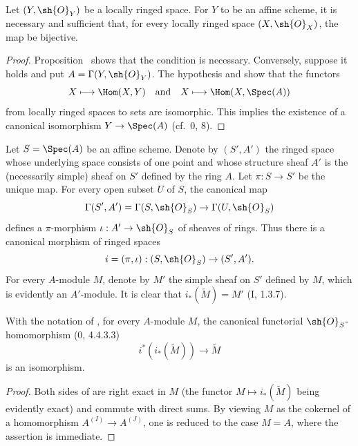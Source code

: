 \begin{corollary}[1.8.3]
\label{I.1.8.3}
Let $(Y,\sh{O}_Y)$ be a locally ringed space.  For $Y$ to be an affine
scheme, it is necessary and sufficient that, for every locally ringed
space $(X,\sh{O}_X)$, the map  be bijective.
\end{corollary}

\begin{proof}
Proposition~ shows that the condition is necessary.
Conversely, suppose it holds and put $A=\Gamma(Y,\sh{O}_Y)$.  The
hypothesis and  show that the functors
\[
  X\longmapsto\Hom(X,Y)
  \quad\hbox{and}\quad
  X\longmapsto\Hom(X,\Spec(A))
\]
from locally ringed spaces to sets are isomorphic.  This implies the
existence of a canonical isomorphism $Y\to\Spec(A)$ (cf.~0, 8).
\end{proof}

\begin{env}[1.8.4]
\label{I.1.8.4}
Let $S=\Spec(A)$ be an affine scheme.  Denote by $(S',A')$ the ringed
space whose underlying space consists of one point and whose
structure sheaf $A'$ is the (necessarily simple) sheaf on $S'$ defined
by the ring $A$.  Let $\pi:S\to S'$ be the unique map.  For every open
subset $U$ of $S$, the canonical map
\[
  \Gamma(S',A')=\Gamma(S,\sh{O}_S)\to\Gamma(U,\sh{O}_S)
\]
defines a $\pi$-morphism $\iota:A'\to\sh{O}_S$ of sheaves of rings.
Thus there is a canonical morphism of ringed spaces
\[
  i=(\pi,\iota):(S,\sh{O}_S)\to(S',A').
\]
For every $A$-module $M$, denote by $M'$ the simple sheaf on $S'$
defined by $M$, which is evidently an $A'$-module.  It is clear that
$i_*(\widetilde M)=M'$ (I, 1.3.7).
\end{env}

\begin{lemma}[1.8.5]
\label{I.1.8.5}
With the notation of , for every $A$-module $M$, the
canonical functorial $\sh{O}_S$-homomorphism (0, 4.4.3.3)
\begin{equation}
\label{I.1.8.5.1}
  i^*(i_*(\widetilde M))\to\widetilde M
\tag{1.8.5.1}
\end{equation}
is an isomorphism.
\end{lemma}

\begin{proof}
Both sides of  are right exact in $M$ (the functor
$M\mapsto i_*(\widetilde M)$ being evidently exact) and commute with
direct sums.  By viewing $M$ as the cokernel of a homomorphism
$A^{(I)}\to A^{(J)}$, one is reduced to the case $M=A$, where the
assertion is immediate.
\end{proof}

